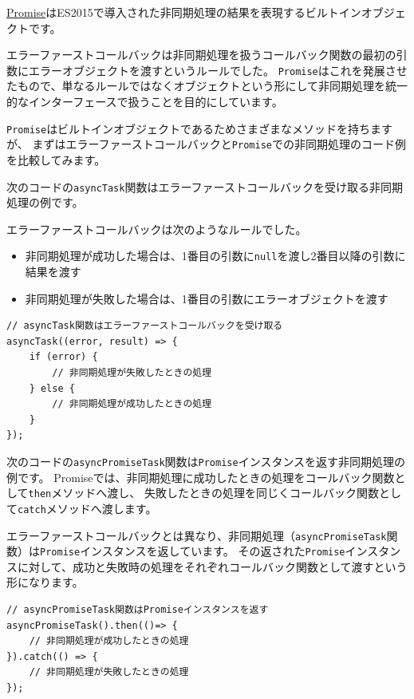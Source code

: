 \href{https://developer.mozilla.org/ja/docs/Web/JavaScript/Reference/Global_Objects/Promise}{Promise}はES2015で導入された非同期処理の結果を表現するビルトインオブジェクトです。

エラーファーストコールバックは非同期処理を扱うコールバック関数の最初の引数にエラーオブジェクトを渡すというルールでした。
\texttt{Promise}はこれを発展させたもので、単なるルールではなくオブジェクトという形にして非同期処理を統一的なインターフェースで扱うことを目的にしています。

\texttt{Promise}はビルトインオブジェクトであるためさまざまなメソッドを持ちますが、
まずはエラーファーストコールバックと\texttt{Promise}での非同期処理のコード例を比較してみます。

次のコードの\texttt{asyncTask}関数はエラーファーストコールバックを受け取る非同期処理の例です。

エラーファーストコールバックは次のようなルールでした。

\begin{itemize}
\item
  非同期処理が成功した場合は、1番目の引数に\texttt{null}を渡し2番目以降の引数に結果を渡す
\item
  非同期処理が失敗した場合は、1番目の引数にエラーオブジェクトを渡す
\end{itemize}

\begin{lstlisting}
// asyncTask関数はエラーファーストコールバックを受け取る
asyncTask((error, result) => {
    if (error) {
        // 非同期処理が失敗したときの処理
    } else {
        // 非同期処理が成功したときの処理
    }
});
\end{lstlisting}

次のコードの\texttt{asyncPromiseTask}関数は\texttt{Promise}インスタンスを返す非同期処理の例です。
Promiseでは、非同期処理に成功したときの処理をコールバック関数として\texttt{then}メソッドへ渡し、
失敗したときの処理を同じくコールバック関数として\texttt{catch}メソッドへ渡します。

エラーファーストコールバックとは異なり、非同期処理（\texttt{asyncPromiseTask}関数）は\texttt{Promise}インスタンスを返しています。
その返された\texttt{Promise}インスタンスに対して、成功と失敗時の処理をそれぞれコールバック関数として渡すという形になります。

\begin{lstlisting}
// asyncPromiseTask関数はPromiseインスタンスを返す
asyncPromiseTask().then(()=> {
    // 非同期処理が成功したときの処理
}).catch(() => {
    // 非同期処理が失敗したときの処理
});
\end{lstlisting}

